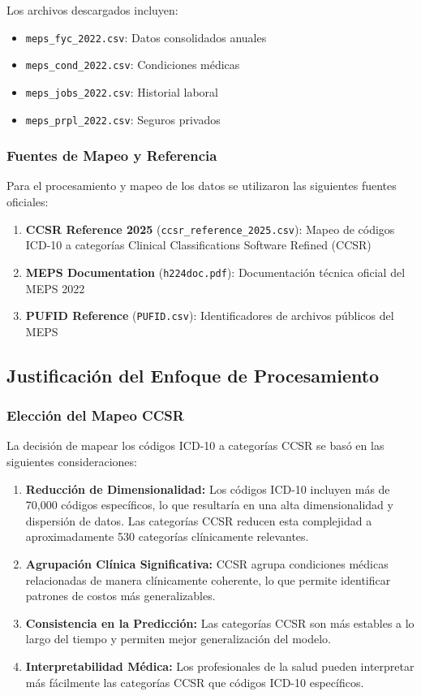 \documentclass[12pt,a4paper]{article}
\begin{document}
Los archivos descargados incluyen:
\begin{itemize}
    \item \texttt{meps\_fyc\_2022.csv}: Datos consolidados anuales
    \item \texttt{meps\_cond\_2022.csv}: Condiciones médicas
    \item \texttt{meps\_jobs\_2022.csv}: Historial laboral
    \item \texttt{meps\_prpl\_2022.csv}: Seguros privados
\end{itemize}

\subsubsection{Fuentes de Mapeo y Referencia}
Para el procesamiento y mapeo de los datos se utilizaron las siguientes fuentes oficiales:
\begin{enumerate}
    \item \textbf{CCSR Reference 2025} (\texttt{ccsr\_reference\_2025.csv}): Mapeo de códigos ICD-10 a categorías Clinical Classifications Software Refined (CCSR)
    \item \textbf{MEPS Documentation} (\texttt{h224doc.pdf}): Documentación técnica oficial del MEPS 2022
    \item \textbf{PUFID Reference} (\texttt{PUFID.csv}): Identificadores de archivos públicos del MEPS
\end{enumerate}

\subsection{Justificación del Enfoque de Procesamiento}

\subsubsection{Elección del Mapeo CCSR}
La decisión de mapear los códigos ICD-10 a categorías CCSR se basó en las siguientes consideraciones:

\begin{enumerate}
    \item \textbf{Reducción de Dimensionalidad:} Los códigos ICD-10 incluyen más de 70,000 códigos específicos, lo que resultaría en una alta dimensionalidad y dispersión de datos. Las categorías CCSR reducen esta complejidad a aproximadamente 530 categorías clínicamente relevantes.
    
    \item \textbf{Agrupación Clínica Significativa:} CCSR agrupa condiciones médicas relacionadas de manera clínicamente coherente, lo que permite identificar patrones de costos más generalizables.
    
    \item \textbf{Consistencia en la Predicción:} Las categorías CCSR son más estables a lo largo del tiempo y permiten mejor generalización del modelo.
    
    \item \textbf{Interpretabilidad Médica:} Los profesionales de la salud pueden interpretar más fácilmente las categorías CCSR que códigos ICD-10 específicos.
\end{enumerate}
\end{document}
